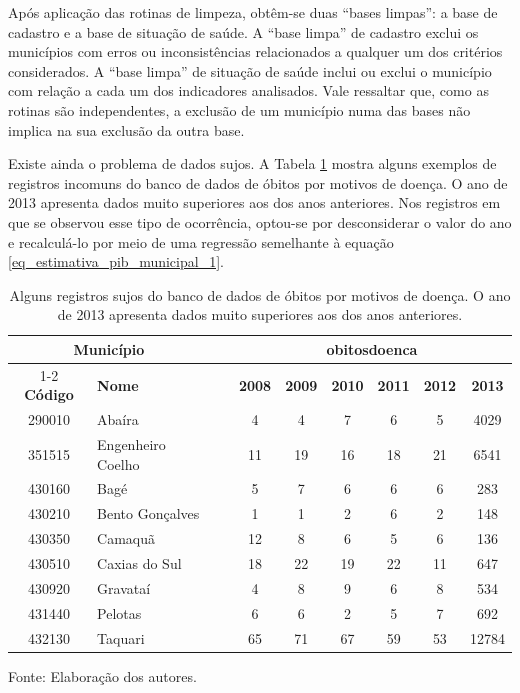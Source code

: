 \documentclass[twoside,onecolumn,12pt]{article}
\numberwithin{outputctr}{section}
\begin{document}
Ap\'{o}s aplica\c{c}\~{a}o das rotinas de limpeza, obt\^{e}m-se duas ``bases limpas'': a base de cadastro e a base de situa\c{c}\~{a}o de sa\'{u}de. A ``base limpa'' de cadastro exclui os munic\'{i}pios com erros ou inconsist\^{e}ncias relacionados a qualquer um dos crit\'{e}rios considerados. A ``base limpa'' de situa\c{c}\~{a}o de sa\'{u}de inclui ou exclui o munic\'{i}pio com rela\c{c}\~{a}o a cada um dos indicadores analisados. Vale ressaltar que, como as rotinas s\~{a}o independentes, a exclus\~{a}o de um munic\'{i}pio numa das bases n\~{a}o implica na sua exclus\~{a}o da outra base.

Existe ainda o problema de dados sujos. A Tabela \ref{tabBdSujo_obitosdoenca} mostra alguns exemplos de registros incomuns do banco de dados de \'{o}bitos por motivos de doen\c{c}a. O ano de 2013 apresenta dados muito superiores aos dos anos anteriores. Nos registros em que se observou esse tipo de ocorrência, optou-se por desconsiderar o valor do ano e recalcul\'{a}-lo por meio de uma regress\~{a}o semelhante à equação \ref{eq_estimativa_pib_municipal_1}.

\begin{table}[htbp]\centering \caption{Alguns registros sujos do banco de dados de \'{o}bitos por motivos de doen\c{c}a. O ano de 2013 apresenta dados muito superiores aos dos anos anteriores. \label{tabBdSujo_obitosdoenca}}
\begin{tabular}{c l c c c c c c c}\hline\hline
\multicolumn{2}{c}{\textbf{Munic\'{i}pio}} & ~ & \multicolumn{6}{c}{\textbf{obitosdoenca}} \\ \cline{1-2} \cline{4-9}
\textbf{C\'{o}digo} & \textbf{Nome} & ~ & \textbf{2008} & \textbf{2009} & \textbf{2010} & \textbf{2011} & \textbf{2012} & \textbf{2013} \\
\hline
290010 & Aba\'{i}ra & ~ & 4 & 4 & 7 & 6 & 5 & 4029 \\
351515 & Engenheiro Coelho & ~ & 11 & 19 & 16 & 18 & 21 & 6541 \\
430160 & Bag\'{e} & ~ & 5 & 7 & 6 & 6 & 6 & 283 \\
430210 & Bento Gon\c{c}alves & ~ & 1 & 1 & 2 & 6 & 2 & 148 \\
430350 & Camaqu\~{a} & ~ & 12 & 8 & 6 & 5 & 6 & 136 \\
430510 & Caxias do Sul & ~ & 18 & 22 & 19 & 22 & 11 & 647 \\
430920 & Gravata\'{i} & ~ & 4 & 8 & 9 & 6 & 8 & 534 \\
431440 & Pelotas & ~ & 6 & 6 & 2 & 5 & 7 & 692 \\
432130 & Taquari & ~ & 65 & 71 & 67 & 59 & 53 & 12784 \\
\hline
\end{tabular}
\begin{tablenotes}
\item \tiny{Fonte: Elaboração dos autores.}
\end{tablenotes}
\end{table}
\end{document}
